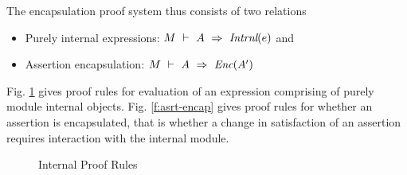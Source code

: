 The encapsulation proof system thus consists of two relations 
\begin{itemize}
\item
Purely internal expressions: $M\ \vdash\ A\ \Rightarrow\ \textit{Intrnl}(e)$ and
\item
Assertion encapsulation: $M\ \vdash\ A\ \Rightarrow\ \textit{Enc}(A')$
\end{itemize}

Fig. \ref{f:intrnl} gives proof rules for evaluation of an expression comprising of purely module internal objects.
Fig. \ref{f:asrt-encap} gives proof rules for whether an assertion is encapsulated, that is whether 
a change in satisfaction of an assertion requires interaction with the internal module.

\begin{figure}[t]
\footnotesize
{}
\caption{Internal Proof Rules}
\label{f:intrnl}
\end{figure}

